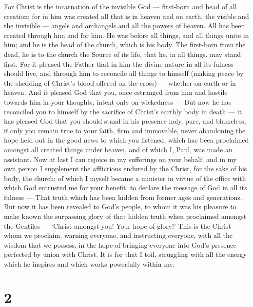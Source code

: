  For Christ is the incarnation of the invisible God ---
first-born and head of all creation;  for in him was
created all that is in heaven and on earth, the visible and the
invisible --- angels and archangels and all the powers of heaven.
 All has been created through him and for him. He was
before all things, and all things unite in him;  and he is
the head of the church, which is his body. The first-born from the dead,
he is to the church the Source of its life, that he, in all things, may
stand first.  For it pleased the Father that in him the
divine nature in all its fulness should live,  and through
him to reconcile all things to himself (making peace by the shedding of
Christ's blood offered on the cross) --- whether on earth or in heaven.
 And it pleased God that you, once estranged from him and
hostile towards him in your thoughts, intent only on wickedness ---
 But now he has reconciled you to himself by the sacrifice
of Christ's earthly body in death --- it has pleased God that you should
stand in his presence holy, pure, and blameless,  if only
you remain true to your faith, firm and immovable, never abandoning the
hope held out in the good news to which you listened, which has been
proclaimed amongst all created things under heaven, and of which I,
Paul, was made an assistant.  Now at last I can rejoice in
my sufferings on your behalf, and in my own person I supplement the
afflictions endured by the Christ, for the sake of his body, the church;
 of which I myself became a minister in virtue of the
office with which God entrusted me for your benefit, to declare the
message of God in all its fulness ---  That truth which has
been hidden from former ages and generations. But now it has been
revealed to God's people,  to whom it was his pleasure to
make known the surpassing glory of that hidden truth when proclaimed
amongst the Gentiles --- `Christ amongst you! Your hope of glory!'
 This is the Christ whom we proclaim, warning everyone, and
instructing everyone, with all the wisdom that we possess, in the hope
of bringing everyone into God's presence perfected by union with Christ.
 It is for that I toil, struggling with all the energy
which he inspires and which works powerfully within me.

\hypertarget{section-1}{%
\section{2}\label{section-1}}

